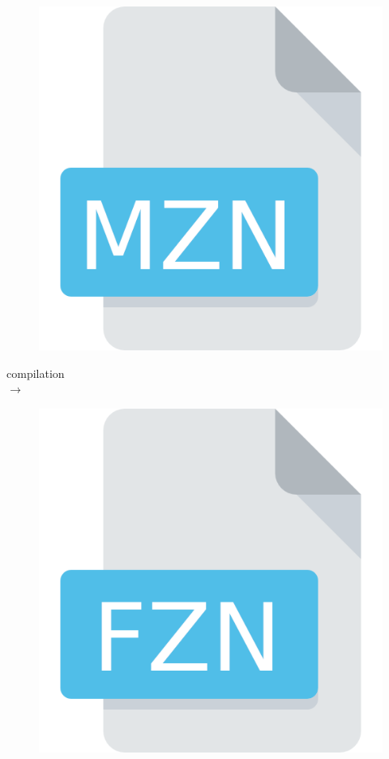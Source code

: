 \documentclass[mathserif,table]{gkibeamer-aaai}
\begin{document}
\begin{frame}
	\begin{multicols}{3}
		\begin{figure}[ht]
			\includegraphics[scale=0.15]{./figures/mzn-icon.png}
		\end{figure}
		\columnbreak
		\begin{center}
			\large{compilation} \\
			\huge{$\rightarrow$}
		\end{center}
		\columnbreak
		\begin{figure}[ht]
			\includegraphics[scale=0.15]{./figures/fzn-icon.png}
		\end{figure}
	\end{multicols}
\end{frame}
\end{document}
